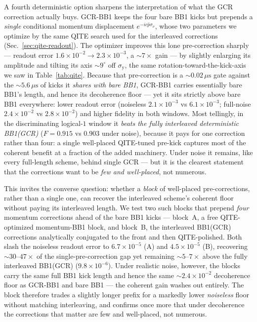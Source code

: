 \documentclass[11pt]{article}
\begin{document}
A fourth deterministic option sharpens the interpretation of what the GCR correction actually buys.
GCR-BB1 keeps the four bare BB1 kicks but prepends a \emph{single} conditional momentum displacement
$e^{-i c\hat p\sigma_\nu}$, whose two parameters we optimize by the same QITE search used for the
interleaved corrections (Sec.~\ref{sec:qite-readout}). The optimizer improves this lone pre-correction
sharply --- readout error $1.6\times10^{-2}\!\to\!2.3\times10^{-3}$, a $\sim\!7\times$ gain --- by
slightly enlarging its amplitude and tilting its axis $\sim\!9^\circ$ off $\sigma_\mathrm{y}$, the same
rotation-toward-the-kick-axis we saw in Table~\ref{tab:qite}. Because that pre-correction is a
$\sim\!0.02\,\mu\mathrm{s}$ gate against the $\sim\!5.6\,\mu\mathrm{s}$ of kicks it \emph{shares with bare
BB1}, GCR-BB1 carries essentially bare BB1's length, and hence its decoherence floor --- yet it sits
strictly above bare BB1 everywhere: lower readout error (noiseless $2.1\times10^{-3}$ vs
$6.1\times10^{-3}$; full-noise $2.4\times10^{-2}$ vs $2.8\times10^{-2}$) and higher fidelity in both
windows. Most tellingly, in the discriminating logical-$1$ window it \emph{beats the fully interleaved
deterministic BB1(GCR)} ($F=0.915$ vs $0.903$ under noise), because it pays for one correction rather
than four: a single well-placed QITE-tuned pre-kick captures most of the coherent benefit at a fraction
of the added machinery. Under noise it remains, like every full-length scheme, behind single GCR --- but
it is the clearest statement that the corrections want to be \emph{few and well-placed}, not numerous.

This invites the converse question: whether a \emph{block} of well-placed pre-corrections, rather than a
single one, can recover the interleaved scheme's coherent floor without paying its interleaved length. We
test two such blocks that prepend \emph{four} momentum corrections ahead of the bare BB1 kicks --- block~A,
a free QITE-optimized momentum-BB1 block, and block~B, the interleaved BB1(GCR) corrections analytically
conjugated to the front and then QITE-polished. Both slash the noiseless readout error to
$6.7\times10^{-5}$ (A) and $4.5\times10^{-5}$ (B), recovering $\sim\!30$--$47\times$ of the
single-pre-correction gap yet remaining $\sim\!5$--$7\times$ above the fully interleaved BB1(GCR)
($9.8\times10^{-6}$). Under realistic noise, however, the blocks carry the same full BB1 kick length and
hence the same $\sim\!2.4\times10^{-2}$ decoherence floor as GCR-BB1 and bare BB1 --- the coherent gain
washes out entirely. The block therefore trades a slightly longer prefix for a markedly lower
\emph{noiseless} floor without matching interleaving, and confirms once more that under decoherence the
corrections that matter are few and well-placed, not numerous.
\end{document}
